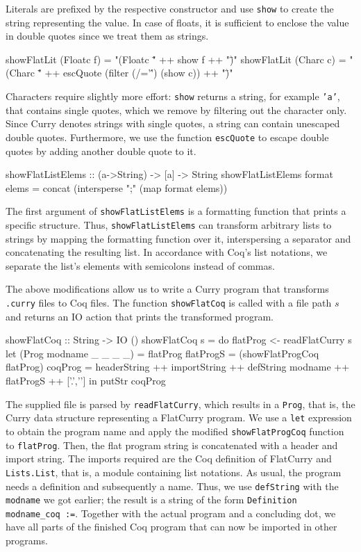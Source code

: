 \documentclass[paper = a4, fleqn, abstract=on, twoside]{scrreprt}
\newcommand{\coqinline}[1]{\texttt{#1}}
\begin{document}
\par
Literals are prefixed by the respective constructor and use \texttt{show} to create the string representing the value. In case of floats, it is sufficient to enclose the value in double quotes since we treat them as strings.
\begin{haskellcode}
showFlatLit (Floatc f) = "(Floatc \"" ++ show f ++ "\")"
showFlatLit (Charc  c) = "(Charc \"" ++ escQuote (filter (/='\'') (show c))
                         ++ "\")"
\end{haskellcode}
Characters require slightly more effort: \texttt{show} returns a string, for example \texttt{'a'}, that contains single quotes, which we remove by filtering out the character only. Since Curry denotes strings with single quotes, a string can contain unescaped double quotes. Furthermore, we use the function \texttt{escQuote} to escape double quotes by adding another double quote to it.
\begin{haskellcode}
showFlatListElems :: (a->String) -> [a] -> String
showFlatListElems format elems = concat (intersperse ";" (map format elems))
\end{haskellcode}
The first argument of \texttt{showFlatListElems} is a formatting function that prints a specific structure. Thus, \texttt{showFlatListElems} can transform arbitrary lists to strings by mapping the formatting function over it, interspersing a separator and concatenating the resulting list. In accordance with Coq's list notations, we separate the list's elements with semicolons instead of commas.\\
\par\noindent
The above modifications allow us to write a Curry program that transforms \texttt{.curry} files to Coq files. The function \texttt{showFlatCoq} is called with a file path $s$ and returns an IO action that prints the transformed program. 
\begin{haskellcode}
showFlatCoq :: String -> IO ()
showFlatCoq s = do flatProg  <- readFlatCurry s
                   let (Prog modname _ _ _ _) = flatProg
                       flatProgS = (showFlatProgCoq flatProg)
                       coqProg   = headerString ++ importString
                                   ++ defString modname ++ flatProgS
                                   ++ ['.','\n']
                    in putStr coqProg
\end{haskellcode}
The supplied file is parsed by \texttt{readFlatCurry}, which results in a \texttt{Prog}, that is, the Curry data structure representing a FlatCurry program. We use a \texttt{let} expression to obtain the program name and apply the modified \texttt{showFlatProgCoq} function to \texttt{flatProg}. Then, the flat program string is concatenated with a header and import string. The imports required are the Coq definition of FlatCurry and \texttt{Lists.List}, that is, a module containing list notations.
As usual, the program needs a definition and subsequently a name. Thus, we use \texttt{defString} with the \texttt{modname} we got earlier; the result is a string of the form \coqinline{Definition modname_coq :=}. Together with the actual program and a concluding dot, we have all parts of the finished Coq program that can now be imported in other programs.
\end{document}
